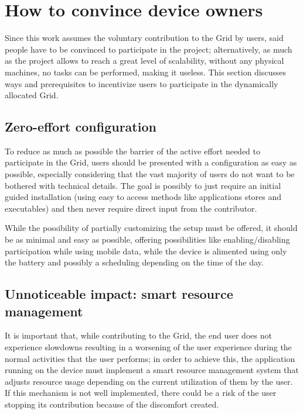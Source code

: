\section{How to convince device owners}
Since this work assumes the voluntary contribution to the Grid by users, said people have to be convinced to participate in the project; alternatively, as much as the project allows to reach a great level of scalability, without any physical machines, no tasks can be performed, making it useless. This section discusses ways and prerequisites to incentivize users to participate in the dynamically allocated Grid.

\subsection{Zero-effort configuration}
To reduce as much as possible the barrier of the active effort needed to participate in the Grid, users should be presented with a configuration as easy as possible, especially considering that the vast majority of users do not want to be bothered with technical details. The goal is possibly to just require an initial guided installation (using easy to access methods like applications stores and executables) and then never require direct input from the contributor.

While the possibility of partially customizing the setup must be offered, it should be as minimal and easy as possible, offering possibilities like enabling/disabling participation while using mobile data, while the device is alimented using only the battery and possibly a scheduling depending on the time of the day. 

\subsection{Unnoticeable impact: smart resource management}
It is important that, while contributing to the Grid, the end user does not experience slowdowns resulting in a worsening of the user experience during the normal activities that the user performs; in order to achieve this, the application running on the device must implement a smart resource management system that adjusts resource usage depending on the current utilization of them by the user. If this mechanism is not well implemented, there could be a risk of the user stopping its contribution because of the discomfort created.

